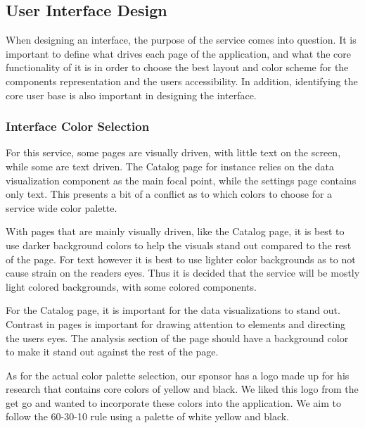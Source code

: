 \subsection{User Interface Design}
When designing an interface, the purpose of the service comes into question. It is important to define what drives each page of the application, and what the core functionality of it is in order to choose the best layout and color scheme for the component\textquotesingle s representation and the user\textquotesingle s accessibility. In addition, identifying the core user base is also important in designing the interface.

\subsubsection{Interface Color Selection}
For this service, some pages are visually driven, with little text on the screen, while some are text driven. The Catalog page for instance relies on the data visualization component as the main focal point, while the settings page contains only text. This presents a bit of a conflict as to which colors to choose for a service wide color palette.\par
With pages that are mainly visually driven, like the Catalog page, it is best to use darker background colors to help the visuals stand out compared to the rest of the page. For text however it is best to use lighter color backgrounds as to not cause strain on the reader\textquotesingle s eyes. Thus it is decided that the service will be mostly light colored backgrounds, with some colored components.\par
For the Catalog page, it is important for the data visualizations to stand out. Contrast in pages is important for drawing attention to elements and directing the user\textquotesingle s eyes. The analysis section of the page should have a background color to make it stand out against the rest of the page.\par
As for the actual color palette selection, our sponsor has a logo made up for his research that contains core colors of yellow and black. We liked this logo from the get go and wanted to incorporate these colors into the application. We aim to follow the 60-30-10 rule using a palette of white yellow and black.

